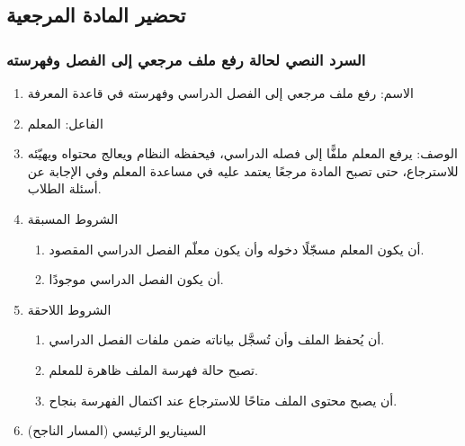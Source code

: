\subsection{تحضير المادة المرجعية}

\subsubsection{السرد النصي لحالة رفع ملف مرجعي إلى الفصل وفهرسته}
\label{subsubsec:uc-ingest}

\begin{enumerate}
  \item الاسم: رفع ملف مرجعي إلى الفصل الدراسي وفهرسته في قاعدة المعرفة
  \item الفاعل: المعلم
  \item الوصف: يرفع المعلم ملفًّا إلى فصله الدراسي، فيحفظه النظام ويعالج محتواه ويهيّئه للاسترجاع، حتى تصبح المادة مرجعًا يعتمد عليه في مساعدة المعلم وفي الإجابة عن أسئلة الطلاب.
  \item الشروط المسبقة
  \begin{enumerate}
    \item أن يكون المعلم مسجّلًا دخوله وأن يكون معلّم الفصل الدراسي المقصود.
    \item أن يكون الفصل الدراسي موجودًا.
  \end{enumerate}
  \item الشروط اللاحقة
  \begin{enumerate}
    \item أن يُحفظ الملف وأن تُسجَّل بياناته ضمن ملفات الفصل الدراسي.
    \item تصبح حالة فهرسة الملف ظاهرة للمعلم.
    \item أن يصبح محتوى الملف متاحًا للاسترجاع عند اكتمال الفهرسة بنجاح.
  \end{enumerate}
  \item السيناريو الرئيسي (المسار الناجح)
\end{enumerate}

